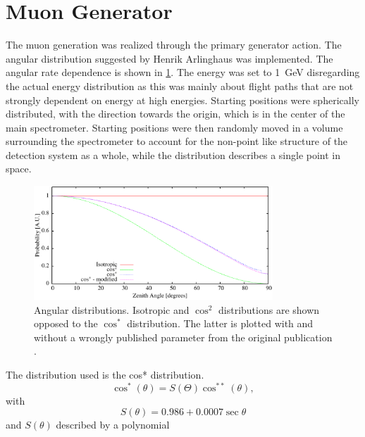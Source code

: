   
  \section{Muon Generator}
  \label{ch:Simulation software:sec:Muon generator}
  
  The muon generation was realized through the primary generator action. The angular distribution suggested by Henrik Arlinghaus \cite{DTArlinghaus} was implemented. The angular rate dependence is shown in \ref{fig:rateDependance}. The energy was set to \SI{1}{\giga\electronvolt} disregarding the actual energy distribution as this was mainly about flight paths that are not strongly dependent on energy at high energies. Starting positions were spherically distributed, with the direction towards the origin, which is in the center of the main spectrometer. Starting positions were then randomly moved in a volume surrounding the spectrometer to account for the non-point like structure of the detection system as a whole, while the distribution describes a single point in space.
  \begin{figure}
  \centering
  \includegraphics[width = 0.8\textwidth]{graphics/simulation/angularDistributions.eps}
  	\caption[Muon Angular Distribution]{Angular distributions. Isotropic and $\cos^2$ distributions are shown opposed to the $\cos^*$ distribution. The latter is plotted with and without a wrongly published parameter from the original publication \cite{distro}.}
  	\label{fig:rateDependance}
  \end{figure}
  The distribution used is the cos* distribution.
  \begin{equation}
  	\cos^*{\left(\theta \right)} = S(\Theta)\cos^{**}{\left(\theta\right)},
  \end{equation}
  with
  \begin{equation}
  	S(\theta) = 0.986 + 0.0007\sec{\theta}
  \end{equation}
  and $S(\theta)$ described by a polynomial
